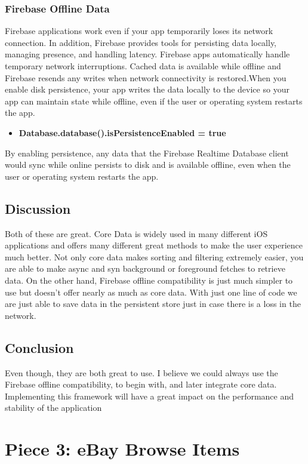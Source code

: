 \documentclass[onecolumn, draftclsnofoot,10pt, compsoc]{IEEEtran}
\begin{document}
\subsubsection{Firebase Offline Data}
\par Firebase applications work even if your app temporarily loses its network connection. In addition, Firebase provides tools for persisting data locally, managing presence, and handling latency. Firebase apps automatically handle temporary network interruptions. Cached data is available while offline and Firebase resends any writes when network connectivity is restored.When you enable disk persistence, your app writes the data locally to the device so your app can maintain state while offline, even if the user or operating system restarts the app.
\begin{itemize}
\item \textbf{Database.database().isPersistenceEnabled = true}
\end{itemize}
By enabling persistence, any data that the Firebase Realtime Database client would sync while online persists to disk and is available offline, even when the user or operating system restarts the app.

\subsection{Discussion}
Both of these are great. Core Data is widely used in many different iOS applications and offers many different great methods to make the user experience much better. Not only core data makes sorting and filtering extremely easier, you are able to make async and syn background or foreground fetches to retrieve data. On the other hand, Firebase offline compatibility is just much simpler to use but doesn't offer nearly as much as core data. With just one line of code we are just able to save data in the persistent store just in case there is a loss in the network.

\subsection{Conclusion}
Even though, they are both great to use. I believe we could always use the Firebase offline compatibility, to begin with, and later integrate core data. Implementing this framework will have a great impact on the performance and stability of the application

\section{Piece 3: eBay Browse Items}
\end{document}
